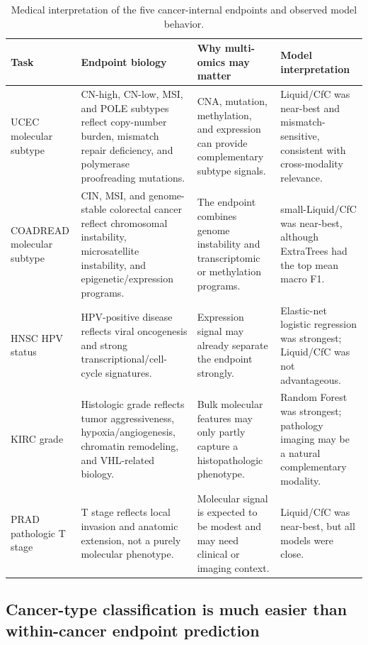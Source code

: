 \begin{table}[ht]
\centering
\caption{Medical interpretation of the five cancer-internal endpoints and observed model behavior.}
\begingroup
\scriptsize
\setlength{\tabcolsep}{3pt}
\begin{tabular}{>{\raggedright\arraybackslash}p{}>{\raggedright\arraybackslash}p{}>{\raggedright\arraybackslash}p{}>{\raggedright\arraybackslash}p{}}
\toprule
Task & Endpoint biology & Why multi-omics may matter & Model interpretation \\
\midrule
UCEC molecular subtype & CN-high, CN-low, MSI, and POLE subtypes reflect copy-number burden, mismatch repair deficiency, and polymerase proofreading mutations. & CNA, mutation, methylation, and expression can provide complementary subtype signals. & Liquid/CfC was near-best and mismatch-sensitive, consistent with cross-modality relevance. \\
COADREAD molecular subtype & CIN, MSI, and genome-stable colorectal cancer reflect chromosomal instability, microsatellite instability, and epigenetic/expression programs. & The endpoint combines genome instability and transcriptomic or methylation programs. & small-Liquid/CfC was near-best, although ExtraTrees had the top mean macro F1. \\
HNSC HPV status & HPV-positive disease reflects viral oncogenesis and strong transcriptional/cell-cycle signatures. & Expression signal may already separate the endpoint strongly. & Elastic-net logistic regression was strongest; Liquid/CfC was not advantageous. \\
KIRC grade & Histologic grade reflects tumor aggressiveness, hypoxia/angiogenesis, chromatin remodeling, and VHL-related biology. & Bulk molecular features may only partly capture a histopathologic phenotype. & Random Forest was strongest; pathology imaging may be a natural complementary modality. \\
PRAD pathologic T stage & T stage reflects local invasion and anatomic extension, not a purely molecular phenotype. & Molecular signal is expected to be modest and may need clinical or imaging context. & Liquid/CfC was near-best, but all models were close. \\
\bottomrule
\end{tabular}
\endgroup
\label{tab:medical_interpretation}
\end{table}

\subsection{Cancer-type classification is much easier than within-cancer endpoint prediction}

